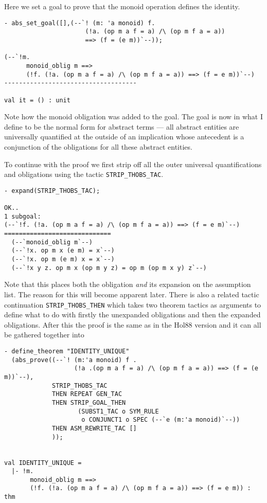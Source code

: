 Here we set a goal to prove that the monoid operation defines the identity.

\begin{small}
\begin{verbatim}
- abs_set_goal([],(--`! (m: 'a monoid) f.
                      (!a. (op m a f = a) /\ (op m f a = a))
                      ==> (f = (e m))`--));

(--`!m.
      monoid_oblig m ==>
      (!f. (!a. (op m a f = a) /\ (op m f a = a)) ==> (f = e m))`--)
------------------------------------

val it = () : unit
\end{verbatim}
\end{small}

Note how the monoid obligation was added to the goal. The goal is now
in what I define to be the normal form for abstract terms --- all
abstract entities are universally quantified at the outside of an
implication whose antecedent is a conjunction of the obligations for
all these abstract entities.

To continue with the proof we first strip off all the outer universal
quantifications and obligations using the tactic
\verb!STRIP_THOBS_TAC!.

\begin{small}
\begin{verbatim}
- expand(STRIP_THOBS_TAC);

OK..
1 subgoal:
(--`!f. (!a. (op m a f = a) /\ (op m f a = a)) ==> (f = e m)`--)
=============================
  (--`monoid_oblig m`--)
  (--`!x. op m x (e m) = x`--)
  (--`!x. op m (e m) x = x`--)
  (--`!x y z. op m x (op m y z) = op m (op m x y) z`--)
\end{verbatim}
\end{small}

Note that this places both the obligation {\em and} its expansion
on the assumption list. The reason for this will become apparent later.
There is also a related tactic continuation \verb!STRIP_THOBS_THEN! which takes
two theorem tactics as arguments to define what to do with firstly the
unexpanded obligations and then the expanded obligations.
After this the proof is the same as in the Hol88 version and it
can all be gathered together into

\begin{small}
\begin{verbatim}
- define_theorem "IDENTITY_UNIQUE"
  (abs_prove((--`! (m:'a monoid) f .
                   (!a .(op m a f = a) /\ (op m f a = a)) ==> (f = (e m))`--),
             STRIP_THOBS_TAC
             THEN REPEAT GEN_TAC
             THEN STRIP_GOAL_THEN
                    (SUBST1_TAC o SYM_RULE
                     o CONJUNCT1 o SPEC (--`e (m:'a monoid)`--))
             THEN ASM_REWRITE_TAC []
             ));


val IDENTITY_UNIQUE =
  |- !m.
       monoid_oblig m ==>
       (!f. (!a. (op m a f = a) /\ (op m f a = a)) ==> (f = e m)) : thm
\end{verbatim}
\end{small}

